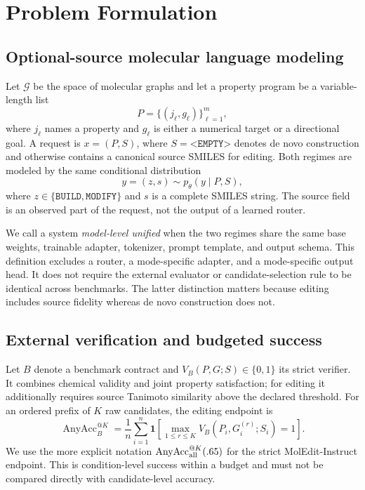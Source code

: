 \section{Problem Formulation}
\subsection{Optional-source molecular language modeling}
Let $\mathcal G$ be the space of molecular graphs and let a property program
be a variable-length list
\begin{equation}
  P=\{(j_\ell,g_\ell)\}_{\ell=1}^{m},
  \label{eq:property-program-unified}
\end{equation}
where $j_\ell$ names a property and $g_\ell$ is either a numerical target or a
directional goal. A request is $x=(P,S)$, where $S=\texttt{<EMPTY>}$ denotes de
novo construction and otherwise contains a canonical source SMILES for
editing. Both regimes are modeled by the same conditional distribution
\begin{equation}
  y=(z,s)\sim p_\theta(y\mid P,S),
  \label{eq:single-policy}
\end{equation}
where $z\in\{\texttt{BUILD},\texttt{MODIFY}\}$ and $s$ is a complete SMILES
string. The source field is an observed part of the request, not the output of
a learned router.

We call a system \emph{model-level unified} when the two regimes share the
same base weights, trainable adapter, tokenizer, prompt template, and output
schema. This definition excludes a router, a mode-specific adapter, and a
mode-specific output head. It does not require the external evaluator or
candidate-selection rule to be identical across benchmarks. The latter
distinction matters because editing includes source fidelity whereas de novo
construction does not.

\subsection{External verification and budgeted success}
Let $B$ denote a benchmark contract and
$V_B(P,G;S)\in\{0,1\}$ its strict verifier. It combines chemical validity and
joint property satisfaction; for editing it additionally requires source
Tanimoto similarity above the declared threshold. For an ordered prefix of
$K$ raw candidates, the editing endpoint is
\begin{equation}
  \operatorname{AnyAcc}^{@K}_{B}
  =\frac{1}{n}\sum_{i=1}^{n}
  \mathbf 1\!\left[\max_{1\le r\le K}
  V_B(P_i,G_i^{(r)};S_i)=1\right].
  \label{eq:any-accuracy}
\end{equation}
We use the more explicit notation
$\operatorname{AnyAcc}^{@K}_{\rm all}(.65)$ for the strict
MolEdit-Instruct endpoint. This is condition-level success within a budget and
must not be compared directly with candidate-level accuracy.

